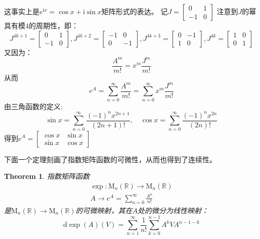 \documentclass[a4paper,12pt]{ctexart}
\newenvironment{prooff}{{\noindent\it\textcolor{cyan!40!black}{Proof}:}\quad}{\par}
\newtheorem{theo}[defn]{Theorem}
\begin{document}
\begin{prooff}
    这事实上是$e^{\text{i} x}=\cos x +\text{i} \sin x$矩阵形式的表达。
    记$J=\begin{bmatrix}
            0  & 1 \\
            -1 & 0
        \end{bmatrix}$
    注意到$J$的幂具有模$4$的周期性，即：
    \begin{equation*}
        J^{4k+1}=\begin{bmatrix}
            0  & 1 \\
            -1 & 0
        \end{bmatrix}, J^{4k+2}=\begin{bmatrix}
            -1 & 0  \\
            0  & -1
        \end{bmatrix},J^{4k+3}=\begin{bmatrix}
            0 & -1 \\
            1 & 0
        \end{bmatrix},J^{4k}=\begin{bmatrix}
            1 & 0 \\
            0 & 1
        \end{bmatrix}
    \end{equation*}
    又因为：\begin{equation*}
        \frac{A^{m}}{m!}=x^m\frac{J^m}{m!}
    \end{equation*}
    从而\begin{equation*}
        e^A=\sum_{n=0}^{\infty}\frac{A^{m}}{m!}=\sum_{n=0}^{\infty}x^m\frac{J^m}{m!}
    \end{equation*}
    由三角函数的定义:\begin{equation*}
        \sin x=\sum_{n=0}^{\infty}\frac{(-1)^nx^{2n+1}}{(2n+1)!},\quad \cos x=\sum_{n=0}^{\infty}\frac{(-1)^nx^{2n}}{(2n)!}
    \end{equation*}
    得到$e^A=\begin{bmatrix}
            \cos x & \sin x \\
            \sin x & \cos x
        \end{bmatrix}$
\end{prooff}
\vskip 0.5cm
下面一个定理刻画了指数矩阵函数的可微性，从而也得到了连续性。
\begin{theo}
    指数矩阵函数\begin{align*}
        \exp : \text{M}_n(\mathbb{R})\rightarrow \text{M}_n(\mathbb{R}) \\
        A\rightarrow e^{A}=\sum_{n=0}^{\infty} \frac{A^n}{n!}
    \end{align*}
    是$\text{M}_n(\mathbb{R})\rightarrow \text{M}_n(\mathbb{R})$的可微映射，其在$A$处的微分为线性映射：
    \begin{equation*}
        \text{d}\exp (A)(V)=\sum_{n=1}^{\infty}\frac{1}{n!}\sum_{k=0}^{n-1}A^kVA^{n-1-k}
    \end{equation*}
\end{theo}
\end{document}
